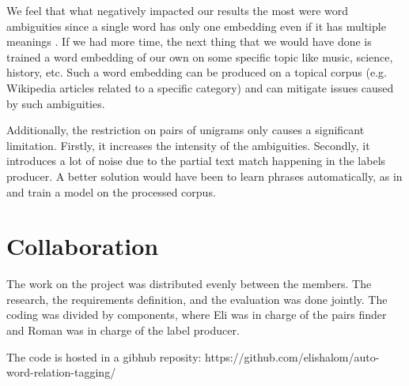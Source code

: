 \documentclass[11pt,a4paper]{article}
\begin{document}
We feel that what negatively impacted our results the most were word ambiguities since a single word has only one embedding even if it has multiple meanings \cite{shi2017jointly}. 
If we had more time, the next thing that we would have done is trained a word embedding of our own on some specific topic like music, science, history, etc. Such a word embedding can be produced on a topical corpus (e.g. Wikipedia articles related to a specific category) and can mitigate issues caused by such ambiguities.

Additionally, the restriction on pairs of unigrams only causes a significant limitation. Firstly, it increases the intensity of the ambiguities. Secondly, it introduces a lot of noise due to the partial text match happening in the labels producer. A better solution would have been to learn phrases automatically, as in \cite{mikolov2013distributed} and train a model on the processed corpus.

\section{Collaboration}

The work on the project was distributed evenly between the members. The research, the requirements definition, and the evaluation was done jointly. The coding was divided by components, where Eli was in charge of the pairs finder and Roman was in charge of the label producer.

The code is hosted in a gibhub reposity: https://github.com/elishalom/auto-word-relation-tagging/

%
%
%




\appendix
\clearpage
\onecolumn
\setcounter{secnumdepth}{0}
\end{document}
